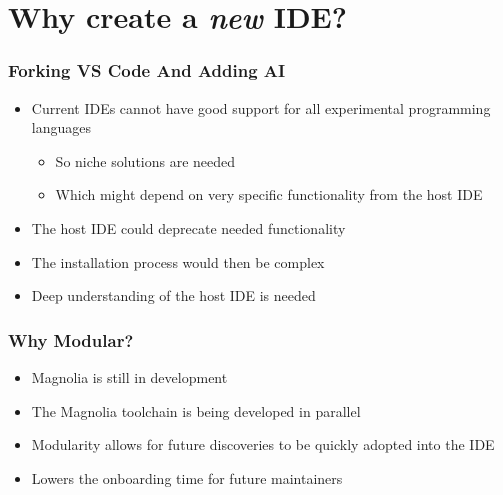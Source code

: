 \section{Why create a \textit{new} IDE?}
\SectionPage

\begin{frame}
  \frametitle{Forking VS Code And Adding AI}
  \begin{itemize}
    \item Current IDEs cannot have good support for all experimental programming
      languages
      \pause
      \begin{itemize}
        \item So niche solutions are needed
          \pause
        \item Which might depend on very specific functionality from the host
          IDE
          \pause
      \end{itemize}
    \item The host IDE could deprecate needed functionality
      \pause
    \item The installation process would then be complex
      \pause
    \item Deep understanding of the host IDE is needed
  \end{itemize}
\end{frame}

\begin{frame}
  \frametitle{Why Modular?}
  \begin{itemize}
    \item Magnolia is still in development
      \pause
    \item The Magnolia toolchain is being developed in parallel
      \pause
    \item Modularity allows for future discoveries to be quickly adopted into
      the IDE
      \pause
    \item Lowers the onboarding time for future maintainers
  \end{itemize}
\end{frame}
